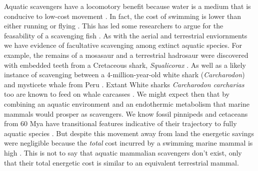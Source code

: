 \documentclass[a4paper,12pt]{article}
\begin{document}
Aquatic scavengers have a locomotory benefit because water is a medium that is conducive to low-cost movement \citep{tucker1975energetic}. 
In fact, the cost of swimming is lower than either running or flying \citep{williams1999evolution}. 
This has led some researchers to argue for the feasability of a scavenging fish \citep{ruxton2004energetic,ruxton2005searching}. 
As with the aerial and terrestrial enviornments we have evidence of facultative scavenging among extinct aquatic species.
For example, the remains of a mosasaur and a terrestrial hadrosaur were discovered with embedded teeth from a Cretaceous shark, \textit{Squalicorax} \citep{schwimmer1997scavenging}.
As well as a likely instance of scavenging between a 4-million-year-old white shark (\textit{Carcharodon}) and mysticete whale from Peru \citep{ehret2009caught}.
Extant White sharks \textit{Carcharodon carcharias} too are known to feed on whale carcasses \citep{fallows2013white}. We might expect then that by combining an aquatic environment and an endothermic metabolism that marine mammals would prosper as scavengers. 
We know fossil pinnipeds and cetaceans from 60 Mya have transitional features indicative of their trajectory to fully aquatic species \citep{williams1999evolution}.  
But despite this movement away from land the energetic savings were negligible because the \textit{total} cost incurred by a swimming marine mammal is high \citep{williams1999evolution}. 
This is not to say that aquatic mammalian scavengers don't exist, only that their total energetic cost is similar to an equivalent terrestrial mammal. 
\end{document}
